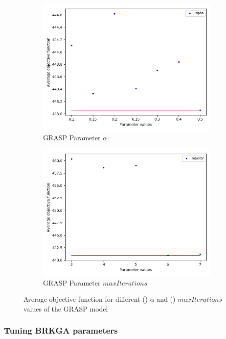 \begin{figure}[h!]
\begin{subfigure}[b]{.49\linewidth}
\centering
\includegraphics[width=0.8\linewidth]{./img/best-alpha.png}
\caption{GRASP Parameter $\alpha$}\label{fig1a}
\end{subfigure}\hfill
\begin{subfigure}[b]{.49\linewidth}
\centering
\includegraphics[width=0.8\linewidth]{./img/best-maxiter.png}
\caption{GRASP Parameter $maxIterations$ }\label{fig1b}
\end{subfigure}\vfill
\caption{Average objective function for different () $\alpha$ and () $maxIterations$ values of the GRASP model}
\label{fig_grasp_params}
\end{figure}


\pagebreak

\subsubsection{Tuning BRKGA parameters}

